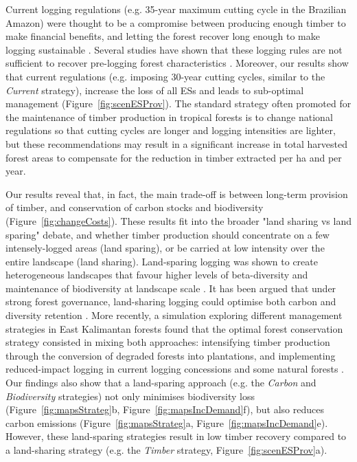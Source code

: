 \documentclass{article}
\begin{document}
Current logging regulations (e.g. 35-year maximum cutting cycle in the Brazilian Amazon) were thought to be a compromise between producing enough timber to make financial benefits, and letting the forest recover long enough to make logging sustainable \cite{Seydack2012}. Several studies have shown that these logging rules are not sufficient to recover pre-logging forest characteristics \cite{Sist2007,Zimmerman2012,Piponiot2018}. Moreover, our results show that current regulations (e.g. imposing 30-year cutting cycles, similar to the \textit{Current} strategy), increase the loss of all ESs and leads to sub-optimal management (Figure~\ref{fig:scenESProv}). The standard strategy often promoted for the maintenance of timber production in tropical forests is to change national regulations so that cutting cycles are longer and logging intensities are lighter, but these recommendations may result in a significant increase in total harvested forest areas to compensate for the reduction in timber extracted per ha and per year.

Our results reveal that, in fact, the main trade-off is between long-term provision of timber, and conservation of carbon stocks and biodiversity (Figure~\ref{fig:changeCosts}). These results fit into the broader "land sharing vs land sparing" debate, and whether timber production should concentrate on a few intensely-logged areas (land sparing), or be carried at low intensity over the entire landscape (land sharing). Land-sparing logging was shown to create heterogeneous landscapes that favour higher levels of beta-diversity and maintenance of biodiversity at landscape scale \cite{DeCastroSolar2015,Edwards2014}. It has been argued that under strong forest governance, land-sharing logging could optimise both carbon and diversity retention \cite{Griscom2018}. More recently, a simulation exploring different management strategies in East Kalimantan forests found that the optimal forest conservation strategy consisted in mixing both approaches: intensifying timber production through the conversion of degraded forests into plantations, and implementing reduced-impact logging in current logging concessions and some natural forests \cite{Runting2018}. Our findings also show that a land-sparing approach (e.g. the \textit{Carbon} and \textit{Biodiversity} strategies) not only minimises biodiversity loss (Figure~\ref{fig:mapsStrateg}b, Figure~\ref{fig:mapsIncDemand}f), but also reduces carbon emissions (Figure~\ref{fig:mapsStrateg}a, Figure~\ref{fig:mapsIncDemand}e). However, these land-sparing strategies result in low timber recovery compared to a land-sharing strategy (e.g. the \textit{Timber} strategy, Figure~\ref{fig:scenESProv}a).
\end{document}
